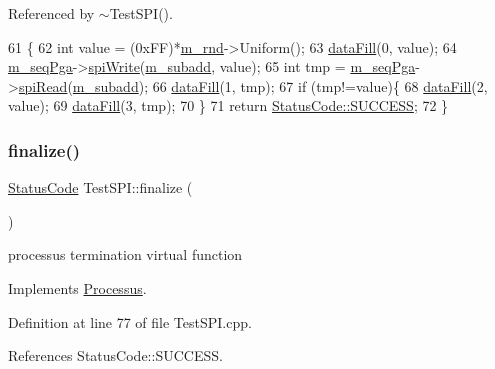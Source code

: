 Referenced by $\sim$\+Test\+S\+P\+I().


\begin{DoxyCode}
61                               \{
62   \textcolor{keywordtype}{int} value = (0xFF)*\hyperlink{classTestSPI_a6dd3f4705c0fc8f36a3e71e67517e1cc}{m\_rnd}->Uniform();
63   \hyperlink{classProcessus_a0d093b48f3218a088ba030e24372f18c}{dataFill}(0, value);
64   \hyperlink{classTestSPI_aab9cccf2a1594a2539b11d6c637389b0}{m\_seqPga}->\hyperlink{classSeqPGA_ad4421841ce4ce8b88ad13f63216f0743}{spiWrite}(\hyperlink{classTestSPI_a4bc59347208b4a5ae97188bdcfc31da2}{m\_subadd}, value);
65   \textcolor{keywordtype}{int} tmp = \hyperlink{classTestSPI_aab9cccf2a1594a2539b11d6c637389b0}{m\_seqPga}->\hyperlink{classSeqPGA_ab3d0e5e5d4014bc7a92588a76b8713d4}{spiRead}(\hyperlink{classTestSPI_a4bc59347208b4a5ae97188bdcfc31da2}{m\_subadd});
66   \hyperlink{classProcessus_a0d093b48f3218a088ba030e24372f18c}{dataFill}(1, tmp);
67   \textcolor{keywordflow}{if} (tmp!=value)\{
68     \hyperlink{classProcessus_a0d093b48f3218a088ba030e24372f18c}{dataFill}(2, value);
69     \hyperlink{classProcessus_a0d093b48f3218a088ba030e24372f18c}{dataFill}(3, tmp);
70   \}
71   \textcolor{keywordflow}{return} \hyperlink{classStatusCode_a6f565cbeadc76d14c72f047e5e85eb4badd0da38d3ba0d922efd1f4619bc37ad8}{StatusCode::SUCCESS};
72 \}
\end{DoxyCode}
\mbox{\label{classTestSPI_aa07f9e513271f933a9166226505779b0}} 
\subsubsection{\texorpdfstring{finalize()}{finalize()}}
{\footnotesize\ttfamily \hyperlink{classStatusCode}{Status\+Code} Test\+S\+P\+I\+::finalize (\begin{DoxyParamCaption}{ }\end{DoxyParamCaption})\hspace{0.3cm}{\ttfamily [virtual]}}

processus termination virtual function 

Implements \hyperlink{classProcessus_aba93d691f031bdb18ae4b8afb1b2e856}{Processus}.



Definition at line 77 of file Test\+S\+P\+I.\+cpp.



References Status\+Code\+::\+S\+U\+C\+C\+E\+SS.



